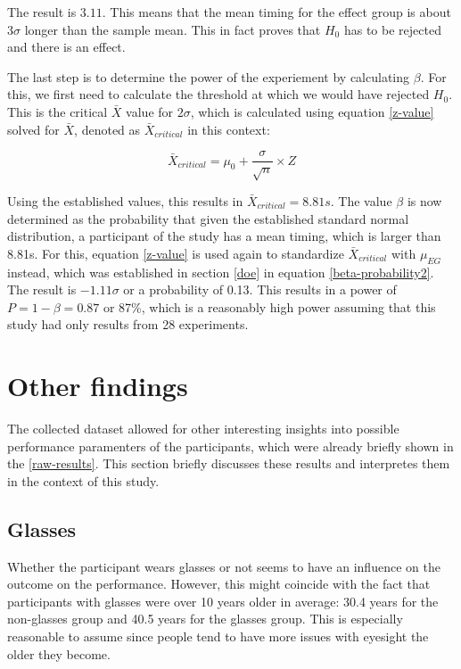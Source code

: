             The result is $3.11$. This means that the mean timing for the effect group is about $3\sigma$ longer than the sample mean. This in fact proves that $H_{0}$ has to be rejected and there is an effect.

            The last step is to determine the power of the experiement by calculating $\beta$. For this, we first need to calculate the threshold at which we would have rejected $H_{0}$. This is the critical $\bar{X}$ value for $2\sigma$, which is calculated using equation \ref{z-value} solved for $\bar{X}$, denoted as $\bar{X}_{critical}$ in this context:

            \begin{equation}\label{x-bar}
                \bar{X}_{critical} = \mu_{0}+\frac{\sigma}{\sqrt{n}}\times Z
            \end{equation}         
            
            Using the established values, this results in $\bar{X}_{critical} = 8.81s$. The value $\beta$ is now determined as the probability that given the established standard normal distribution, a participant of the study has a mean timing, which is larger than 8.81s. For this, equation \ref{z-value} is used again to standardize $\bar{X}_{critical}$ with $\mu_{EG}$ instead, which was established in section \ref{doe} in equation \ref{beta-probability2}. The result is $-1.11\sigma$ or a probability of 0.13. This results in a power of $P=1-\beta=0.87$ or 87\%, which is a reasonably high power assuming that this study had only results from 28 experiments.

        \section{Other findings}\label{other-findings}

            The collected dataset allowed for other interesting insights into possible performance paramenters of the participants, which were already briefly shown in the \ref*{raw-results}. This section briefly discusses these results and interpretes them in the context of this study.

            \subsection{Glasses}

                Whether the participant wears glasses or not seems to have an influence on the outcome on the performance. However, this might coincide with the fact that participants with glasses were over 10 years older in average: 30.4 years for the non-glasses group and 40.5 years for the glasses group. This is especially reasonable to assume since people tend to have more issues with eyesight the older they become.  


